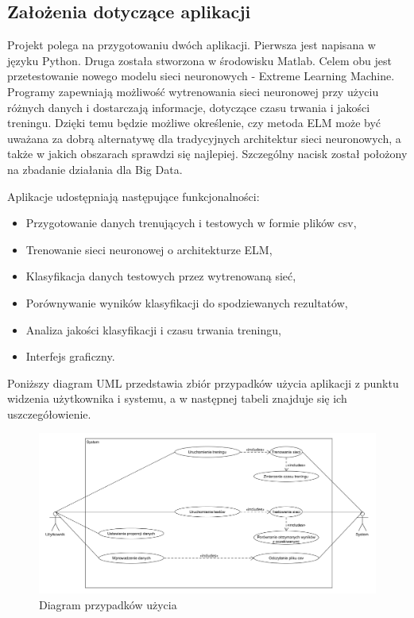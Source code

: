 \documentclass{article}
\begin{document}
\subsection{Założenia dotyczące aplikacji}
Projekt polega na przygotowaniu dwóch aplikacji. Pierwsza jest napisana w języku Python. Druga została stworzona w środowisku Matlab. Celem obu jest przetestowanie nowego modelu sieci neuronowych - Extreme Learning Machine. Programy zapewniają możliwość wytrenowania sieci neuronowej przy użyciu różnych danych i dostarczają informacje, dotyczące czasu trwania i jakości treningu. Dzięki temu będzie możliwe określenie, czy metoda ELM może być uważana za dobrą alternatywę dla tradycyjnych architektur sieci neuronowych, a także w jakich obszarach sprawdzi się najlepiej. Szczególny nacisk został położony na zbadanie działania dla Big Data.

Aplikacje udostępniają następujące funkcjonalności:
\begin{itemize}
\item Przygotowanie danych trenujących i testowych w formie plików csv,
\item Trenowanie sieci neuronowej o architekturze ELM,
\item Klasyfikacja danych testowych przez wytrenowaną sieć,
\item Porównywanie wyników klasyfikacji do spodziewanych rezultatów,
\item Analiza jakości klasyfikacji i  czasu trwania treningu,
\item Interfejs graficzny.
\end{itemize}
Poniższy diagram UML przedstawia zbiór przypadków użycia aplikacji z punktu widzenia użytkownika i systemu, a w następnej tabeli znajduje się ich uszczegółowienie.
\begin{figure}[H]
\includegraphics[width=\textwidth]{use_case.png}
\caption{Diagram przypadków użycia}
\end{figure}
\end{document}
